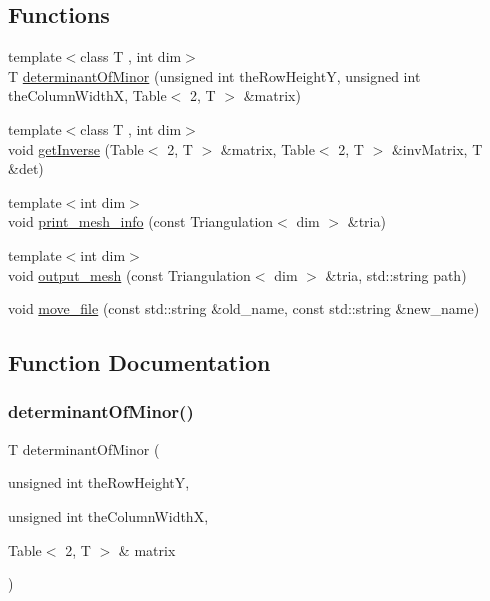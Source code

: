 \subsection*{Functions}
\begin{DoxyCompactItemize}
\item 
{\footnotesize template$<$class T , int dim$>$ }\\T \mbox{\hyperlink{supplementary_functions_8h_a95bed1847eed9d7f9da90da4aa8fe7c1}{determinant\+Of\+Minor}} (unsigned int the\+Row\+HeightY, unsigned int the\+Column\+WidthX, Table$<$ 2, T $>$ \&matrix)
\item 
{\footnotesize template$<$class T , int dim$>$ }\\void \mbox{\hyperlink{supplementary_functions_8h_ade5a79ed03042894cbe451fc7e1ccdf1}{get\+Inverse}} (Table$<$ 2, T $>$ \&matrix, Table$<$ 2, T $>$ \&inv\+Matrix, T \&det)
\item 
{\footnotesize template$<$int dim$>$ }\\void \mbox{\hyperlink{group___supplementary_ga2971a293263dddc17f3df81add2ffbbe}{print\+\_\+mesh\+\_\+info}} (const Triangulation$<$ dim $>$ \&tria)
\item 
{\footnotesize template$<$int dim$>$ }\\void \mbox{\hyperlink{group___supplementary_ga0272b346b175b931e89b017fd93b5b80}{output\+\_\+mesh}} (const Triangulation$<$ dim $>$ \&tria, std\+::string path)
\item 
void \mbox{\hyperlink{group___supplementary_gae0eb2d2afc3e33a9bb3b409b0171c470}{move\+\_\+file}} (const std\+::string \&old\+\_\+name, const std\+::string \&new\+\_\+name)
\end{DoxyCompactItemize}


\subsection{Function Documentation}
\mbox{\label{supplementary_functions_8h_a95bed1847eed9d7f9da90da4aa8fe7c1}} 
\subsubsection{\texorpdfstring{determinant\+Of\+Minor()}{determinantOfMinor()}}
{\footnotesize\ttfamily T determinant\+Of\+Minor (\begin{DoxyParamCaption}\item[{unsigned int}]{the\+Row\+HeightY,  }\item[{unsigned int}]{the\+Column\+WidthX,  }\item[{Table$<$ 2, T $>$ \&}]{matrix }\end{DoxyParamCaption})\hspace{0.3cm}{\ttfamily [inline]}}

